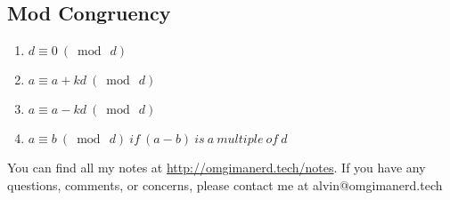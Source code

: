 \documentclass[letterpaper, 12pt]{math}
\begin{document}
\subsection*{Mod Congruency}
\begin{enumerate}
  \item \( d\equiv0\ (\bmod\ d) \) \\
  \item \( a\equiv a+kd\ (\bmod\ d) \) \\
  \item \( a\equiv a-kd\ (\bmod\ d) \) \\
  \item \( a\equiv b\ (\bmod\ d)\ if\ (a-b)\ is\ a\ multiple\ of\ d \)
\end{enumerate}

\begin{center}
  You can find all my notes at \url{http://omgimanerd.tech/notes}. If you have
  any questions, comments, or concerns, please contact me at
  alvin@omgimanerd.tech
\end{center}
\end{document}
